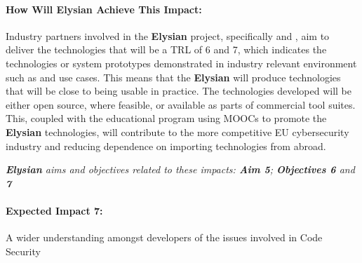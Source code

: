 \documentclass[a4paper,11pt]{article}
\newcommand{\project}[1]{\textbf{#1}\xspace}
\newcommand{\SECURITY}{\project{Elysian}}
\newcommand{\TheProject}{\SECURITY}
\begin{document}
\begin{mdframed}[backgroundcolor=gray!10]
\paragraph{How Will \TheProject{} Achieve This Impact:}
Industry partners involved in the \TheProject{} project, specifically \IBMshort{} and \YAGshort{}, aim to deliver the technologies that will be a TRL of 6 and 7, which indicates the technologies or system prototypes demonstrated in industry relevant environment such as \SOPRAshort{} and \FRQshort{} use cases. This means that the \TheProject{} will produce technologies that will be close to being usable in practice. The technologies developed will be either open source, where feasible, or available as parts of commercial tool suites. This, coupled with the educational program using MOOCs to promote the \TheProject{} technologies, will contribute to the more competitive EU cybersecurity industry and reducing dependence on importing technologies from abroad.

\emph{\TheProject{} aims and objectives related to these impacts: \textbf{Aim 5}; \textbf{Objectives 6} and \textbf{7}}
\end{mdframed}




\begin{mdframed}[backgroundcolor=blue!5]
\paragraph{Expected Impact 7:}
A wider understanding amongst developers of the issues involved in Code Security
\end{mdframed}
\end{document}
